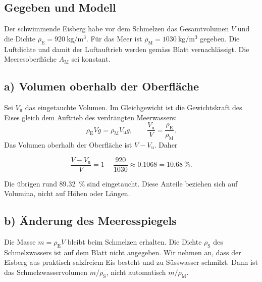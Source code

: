 \subsection*{Gegeben und Modell}
Der schwimmende Eisberg habe vor dem Schmelzen das Gesamtvolumen $V$ und die
Dichte $\rho_\mathrm E=\qty{920}{\kilogram\per\metre\cubed}$. Für das Meer
ist $\rho_\mathrm M=\qty{1030}{\kilogram\per\metre\cubed}$ gegeben. Die
Luftdichte und damit der Luftauftrieb werden gemäss Blatt vernachlässigt.
Die Meeresoberfläche $A_\mathrm M$ sei konstant.

\subsection*{a) Volumen oberhalb der Oberfläche}
Sei $V_\mathrm{u}$ das eingetauchte Volumen. Im Gleichgewicht ist die
Gewichtskraft des Eises gleich dem Auftrieb des verdrängten Meerwassers:
\begin{equation}
  \rho_\mathrm E Vg=\rho_\mathrm M V_\mathrm{u}g,
  \qquad \frac{V_\mathrm{u}}{V}=\frac{\rho_\mathrm E}{\rho_\mathrm M}.
\end{equation}
Das Volumen oberhalb der Oberfläche ist $V-V_\mathrm{u}$. Daher
\begin{ergebnis}
\begin{equation*}
  \frac{V-V_\mathrm{u}}{V}
  =1-\frac{920}{1030}\approx \num{0.1068}=\qty{10.68}{\percent}.
\end{equation*}
\end{ergebnis}
Die übrigen rund \qty{89.32}{\percent} sind eingetaucht. Diese Anteile
beziehen sich auf Volumina, nicht auf Höhen oder Längen.

\subsection*{b) Änderung des Meeresspiegels}
Die Masse $m=\rho_\mathrm E V$ bleibt beim Schmelzen erhalten. Die Dichte
$\rho_\mathrm S$ des Schmelzwassers ist auf dem Blatt nicht angegeben. Wir
nehmen an, dass der Eisberg aus praktisch salzfreiem Eis besteht und zu
Süsswasser schmilzt. Dann ist das Schmelzwasservolumen $m/\rho_\mathrm S$,
nicht automatisch $m/\rho_\mathrm M$.

